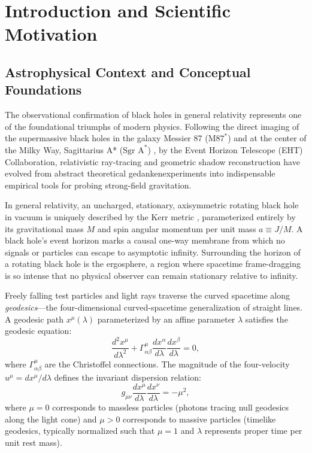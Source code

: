 \section{Introduction and Scientific Motivation}
\label{sec:introduction}

\subsection{Astrophysical Context and Conceptual Foundations}
The observational confirmation of black holes in general relativity represents one of the foundational triumphs of modern physics. Following the direct imaging of the supermassive black holes in the galaxy Messier 87 ($\text{M87}^*$) \cite{EHT2019_PaperI} and at the center of the Milky Way, Sagittarius A* ($\text{Sgr A}^*$) \cite{EHT2022_PaperI}, by the Event Horizon Telescope (EHT) Collaboration, relativistic ray-tracing and geometric shadow reconstruction have evolved from abstract theoretical gedankenexperiments into indispensable empirical tools for probing strong-field gravitation.

In general relativity, an uncharged, stationary, axisymmetric rotating black hole in vacuum is uniquely described by the Kerr metric \cite{Kerr1963}, parameterized entirely by its gravitational mass $M$ and spin angular momentum per unit mass $a \equiv J/M$. A black hole's event horizon marks a causal one-way membrane from which no signals or particles can escape to asymptotic infinity. Surrounding the horizon of a rotating black hole is the ergosphere, a region where spacetime frame-dragging is so intense that no physical observer can remain stationary relative to infinity.

Freely falling test particles and light rays traverse the curved spacetime along \textit{geodesics}---the four-dimensional curved-spacetime generalization of straight lines. A geodesic path $x^\mu(\lambda)$ parameterized by an affine parameter $\lambda$ satisfies the geodesic equation:
\begin{equation}
    \frac{d^2 x^\mu}{d\lambda^2} + \Gamma^\mu_{\alpha\beta} \frac{dx^\alpha}{d\lambda} \frac{dx^\beta}{d\lambda} = 0,
    \label{eq:geodesic_standard}
\end{equation}
where $\Gamma^\mu_{\alpha\beta}$ are the Christoffel connections. The magnitude of the four-velocity $u^\mu = dx^\mu/d\lambda$ defines the invariant dispersion relation:
\begin{equation}
    g_{\mu\nu} \frac{dx^\mu}{d\lambda} \frac{dx^\nu}{d\lambda} = -\mu^2,
    \label{eq:dispersion_intro}
\end{equation}
where $\mu = 0$ corresponds to massless particles (photons tracing null geodesics along the light cone) and $\mu > 0$ corresponds to massive particles (timelike geodesics, typically normalized such that $\mu = 1$ and $\lambda$ represents proper time per unit rest mass).


